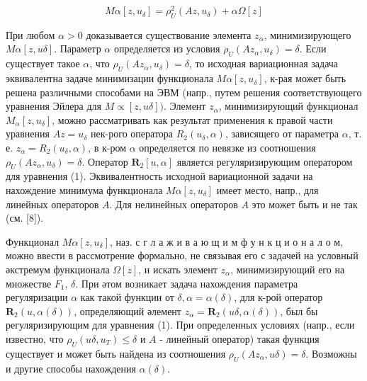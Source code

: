 \documentclass[10pt]{article}
\begin{document}
\[

M \alpha\left[z, u_{\delta}\right]=\rho_{U}^{2}\left(A z, u_{\delta}\right)+\alpha \Omega[z]

\]



При любом $\alpha>0$ доказывается существование элемента $z_{\alpha}$, минимизирующего $M \alpha[z, u \delta]$. Параметр $\alpha$ определяется из условия $\rho_{U}\left(A z_{\alpha}, u_{\delta}\right)=\delta$. Если существует такое $\alpha$, что $\rho_{U}\left(A z_{\alpha}, u_{\delta}\right)=\delta$, то исходная вариационная задача эквивалентна задаче минимизации функционала $M \alpha\left[z, u_{\delta}\right]$, к-рая может быть решена различными способами на ЭВМ (напр., путем решения соответствующего уравнения Эйлера для $M \propto[z, u \delta])$. Элемент $z_{\alpha}$, минимизирующий функционал $M_{\alpha}\left[z, u_{\delta}\right]$, можно рассматривать как результат применения к правой части уравнения $A z=u_{\delta}$ нек-рого оператора $R_{2}\left(u_{\delta}, \alpha\right)$, зависящего от параметра $\alpha$, т. е. $z_{\alpha}=R_{2}\left(u_{\delta}, \alpha\right)$, в к-ром $\alpha$ определяется по невязке из соотношения $\rho_{U}\left(A z_{\alpha}, u_{\delta}\right)=\delta$. Оператор $\boldsymbol{R}_{2}[u, \alpha]$ является регуляризирующим оператором для уравнения (1). Эквивалентность исходной вариационной задачи на нахождение минимума функционала $M \alpha\left[z, u_{\delta}\right]$ имеет место, напр., для линейных операторов $A$. Для нелинейных операторов $A$ это может быть и не так (см. [8]).



Функционал $M \alpha\left[z, u_{\delta}\right]$, наз. с г л а ж и в а ю щ и м ф у н к ц и о н а л о м, можно ввести в рассмотрение формально, не связывая его с задачей на условный әкстремум функционала $\Omega[z]$, и искать элемент $z_{\alpha}$, минимизирующий его на множестве $F_{1}$, $\delta$. При әтом возникает задача нахождения параметра регуляризации $\alpha$ как такой функции от $\delta, \alpha=\alpha(\delta)$, для к-рой оператор $\boldsymbol{R}_{2}(u, \alpha(\delta))$, определяющий әлемент $z_{\alpha}=\boldsymbol{R}_{2}(u \delta, \alpha(\delta))$, был бы регуляризирующим для уравнения (1). При определенных условиях (напр., если известно, что $\rho_{U}\left(u \delta, u_{T}\right) \leqslant \delta$ и $A$ - линейный оператор) такая функция существует и может быть найдена из соотношения $\rho_{U}\left(A z_{\alpha}, u \delta\right)=\delta$. Возможны и другие способы нахождения $\alpha(\delta)$.
\end{document}
